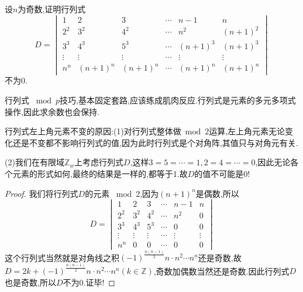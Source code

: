 \documentclass[../../main.tex]{subfiles}
\begin{document}
\begin{example}
设\( n \)为奇数,证明行列式
\[
D = \begin{vmatrix}
1 & 2 & 3 & \cdots & n-1 & n \\
2^2 & 3^2 & 4^2 & \cdots & n^2 & (n+1)^2 \\
3^3 & 4^3 & 5^3 & \cdots & (n+1)^3 & (n+1)^3 \\
\vdots & \vdots & \vdots & \cdots & \vdots & \vdots \\
n^n & (n+1)^n & (n+1)^n & \cdots & (n+1)^n & (n+1)^n
\end{vmatrix}
\]
不为0.
\end{example}
\begin{note}
行列式 \(\bmod p\)技巧,基本固定套路,应该练成肌肉反应.行列式是元素的多元多项式操作,因此求余数也会保持.
\end{note}
\begin{remark}
行列式左上角元素不变的原因:(1)对行列式整体做$\bmod 2$运算,左上角元素无论变化还是不变都不影响行列式的值,因为此时行列式是个对角阵,其值只与对角元有关.

(2)我们在有限域\( \mathbb{Z}_w \)上考虑行列式\( D \),这样$3=5=\cdots =1,2=4=\cdots =0$,因此无论各个元素的形式如何,最终的结果是一样的,都等于1.故$D$的值不可能是0!
\end{remark}
\begin{proof}
我们将行列式\( D \)的元素 \(\bmod 2\),因为\( (n+1)^n \)是偶数,所以
\[
D = \begin{vmatrix}
1 & 2 & 3 & \cdots & n-1 & n \\
2^2 & 3^2 & 4^2 & \cdots & n^2 & 0 \\
3^3 & 4^3 & 5^3 & \cdots & 0 & 0 \\
\vdots & \vdots & \vdots & \cdots & \vdots & \vdots \\
n^n & 0 & 0 & \cdots & 0 & 0
\end{vmatrix}
\]
这个行列式当然就是对角线之积\(\left( -1 \right) ^{\frac{n\left( n-1 \right)}{2}}n\cdot n^2\cdots n^n\)还是奇数,故$D=2k+\left( -1 \right) ^{\frac{n\left( n-1 \right)}{2}}n\cdot n^2\cdots n^n(k\in \mathbb{Z})$,奇数加偶数当然还是奇数.因此行列式\( D \)也是奇数,所以\( D \)不为0.证毕!

\end{proof}
\end{document}
